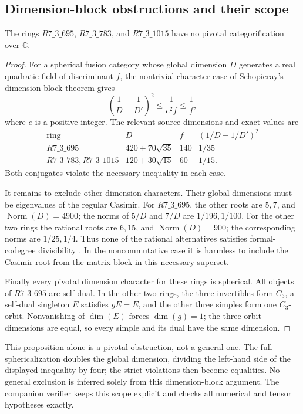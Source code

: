 \subsection{Dimension-block obstructions and their scope}
\label{subsec:dimension-block}

\begin{proposition}\label{prop:pivotal-dimension-block}
The rings $R7\_3\_695$, $R7\_3\_783$, and $R7\_3\_1015$ have no
pivotal categorification over $\mathbb C$.
\end{proposition}
\begin{proof}
For a spherical fusion category whose global dimension $D$ generates
a real quadratic field of discriminant $f$, the nontrivial-character
case of Schopieray's dimension-block theorem
\cite[Theorem~5.1]{SchopierayDimensionBlock} gives
\[
 \left(\frac1D-\frac1{D'}\right)^2\leq\frac1{e^2 f}
 \leq\frac1f,
\]
where $e$ is a positive integer. The relevant source dimensions and
exact values are
\[
\begin{array}{c|c|r|c}
 \text{ring}&D&f&(1/D-1/D')^2\\ \hline
 R7\_3\_695&420+70\sqrt{35}&140&1/35\\
 R7\_3\_783, R7\_3\_1015&120+30\sqrt{15}&60&1/15.
\end{array}
\]
Both conjugates violate the necessary inequality in each case.

It remains to exclude other dimension characters. Their global
dimensions must be eigenvalues of the regular Casimir. For
$R7\_3\_695$, the other roots are $5,7$, and
$\operatorname{Norm}(D)=4900$; the norms of $5/D$ and $7/D$ are
$1/196,1/100$. For the other two rings the rational roots are $6,15$,
and $\operatorname{Norm}(D)=900$; the corresponding norms are
$1/25,1/4$. Thus none of the rational alternatives satisfies
formal-codegree divisibility
\cite[Corollary~2.14]{OstrikRank3}. In the noncommutative case it is
harmless to include the Casimir root from the matrix block in this
necessary superset.

Finally every pivotal dimension character for these rings is
spherical. All objects of $R7\_3\_695$ are self-dual. In the other
two rings, the three invertibles form $C_3$, a self-dual singleton
$E$ satisfies $gE=E$, and the other three simples form one $C_3$-orbit.
Nonvanishing of $\dim(E)$ forces $\dim(g)=1$; the three orbit dimensions
are equal, so every simple and its dual have the same dimension.
\end{proof}

This proposition alone is a pivotal obstruction, not a general one.
The full sphericalization doubles the global dimension, dividing the
left-hand side of the displayed inequality by four; the strict
violations then become equalities. No general exclusion is inferred
solely from this dimension-block argument. The companion verifier
keeps this scope explicit and checks all numerical and tensor
hypotheses exactly.
